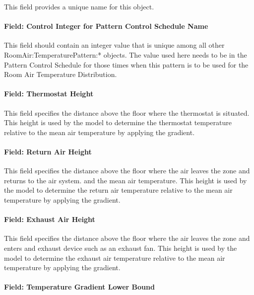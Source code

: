 This field provides a unique name for this object.

\paragraph{Field: Control Integer for Pattern Control Schedule Name}\label{field-control-integer-for-pattern-control-schedule-name-1}

This field should contain an integer value that is unique among all other RoomAir:TemperaturePattern:* objects. The value used here needs to be in the Pattern Control Schedule for those times when this pattern is to be used for the Room Air Temperature Distribution.

\paragraph{Field: Thermostat Height}\label{field-thermostat-height}

This field specifies the distance above the floor where the thermostat is situated. This height is used by the model to determine the thermostat temperature relative to the mean air temperature by applying the gradient.

\paragraph{Field: Return Air Height}\label{field-return-air-height}

This field specifies the distance above the floor where the air leaves the zone and returns to the air system. and the mean air temperature. This height is used by the model to determine the return air temperature relative to the mean air temperature by applying the gradient.

\paragraph{Field: Exhaust Air Height}\label{field-exhaust-air-height}

This field specifies the distance above the floor where the air leaves the zone and enters and exhaust device such as an exhaust fan. This height is used by the model to determine the exhaust air temperature relative to the mean air temperature by applying the gradient.

\paragraph{Field: Temperature Gradient Lower Bound}\label{field-temperature-gradient-lower-bound}

